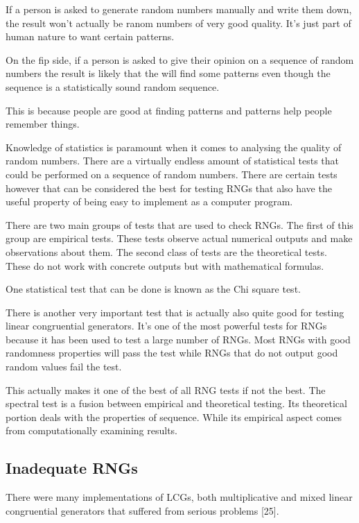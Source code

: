 \documentclass{article}
\begin{document}
    If a person is asked to generate random numbers manually and write them down,
    the result won't actually be ranom numbers of very good quality.
    It's just part of human nature to want certain patterns.

    On the fip side, if a person is asked to give their opinion on
    a sequence of random numbers the result is likely that the will find some patterns
    even though the sequence is a statistically sound random sequence.

    This is because people are good at finding patterns and patterns help people remember
    things.

    Knowledge of statistics is paramount when it comes to analysing the quality
    of random numbers. There are a virtually endless amount of statistical tests
    that could be performed on a sequence of random numbers.
    There are certain tests however that can be considered the best for testing RNGs
    that also have the useful property of being easy to implement as a computer program.

    There are two main groups of tests that are used to check RNGs.
    The first of this group are empirical tests. These tests observe
    actual numerical outputs and make observations about them.
    The second class of tests are the theoretical tests.
    These do not work with concrete outputs but with mathematical formulas.

    One statistical test that can be done is known as the Chi square test.

    There is another very important test that is actually also quite good
    for testing linear congruential generators. It's one of the most powerful
    tests for RNGs because it has been used to test a large number of
    RNGs. Most RNGs with good randomness properties will pass the test while
    RNGs that do not output good random values fail the test.

    This actually makes it one of the best of all RNG tests if not the best.
    The spectral test is a fusion between empirical and theoretical testing.
    Its theoretical portion deals with the properties of sequence.
    While its empirical aspect comes from computationally examining results.

    \subsection{Inadequate RNGs}

    There were many implementations of LCGs, both multiplicative and
    mixed linear congruential generators that suffered from serious problems [25].
\end{document}
